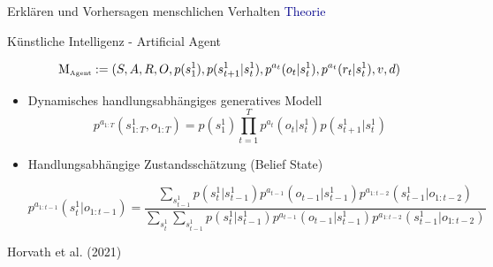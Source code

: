 \documentclass[
  8pt,
  ignorenonframetext,
]{beamer}
\begin{document}
\begin{frame}{Erklären und Vorhersagen menschlichen Verhalten}
\protect\hypertarget{erkluxe4ren-und-vorhersagen-menschlichen-verhalten-1}{}
\textcolor{darkblue}{Theorie}

Künstliche Intelligenz - Artificial Agent

\begin{equation*}
\mbox{M}_{\mbox{\tiny Agent}}
:= (S,A,R,O,p(s_1^1),p(s_{t+1}^1|s_t^{1}), p^{a_t}(o_t|s_t^1), p^{a_t}(r_t|s_t^1), v, d)
\end{equation*} \vspace{-5mm}

\begin{itemize}
\itemsep2mm
\item Dynamisches handlungsabhängiges generatives Modell
\vspace{-3mm}
\begin{equation*}
p^{a_{1:T}}(s_{1:T}^1,o_{1:T})
= p(s_1^1) \prod_{t=1}^T p^{a_t}(o_t|s_t^1)p(s_{t+1}^1|s_t^{1})
\end{equation*}
\vspace{-5mm}
\item Handlungsabhängige Zustandsschätzung (Belief State)
\begin{footnotesize}
\begin{equation*}
p^{a_{1:t-1}}(s_t^1|o_{1:t-1})
= \frac{\sum_{s_{t-1}^1} p(s_t^1|s_{t-1}^1)p^{a_{t-1}}(o_{t-1}|s_{t-1}^1)p^{a_{1:t-2}}(s_{t-1}^1|o_{1:t-2})}
       {\sum_{s_t^1}\sum_{s_{t-1}^1} p(s_t^1|s_{t-1}^1)p^{a_{t-1}}(o_{t-1}|s_{t-1}^1)p^{a_{1:t-2}}(s_{t-1}^1|o_{1:t-2})}
\end{equation*}
\end{footnotesize}
\end{itemize}

\flushright
\footnotesize

Horvath et al. (2021)
\end{frame}
\end{document}
